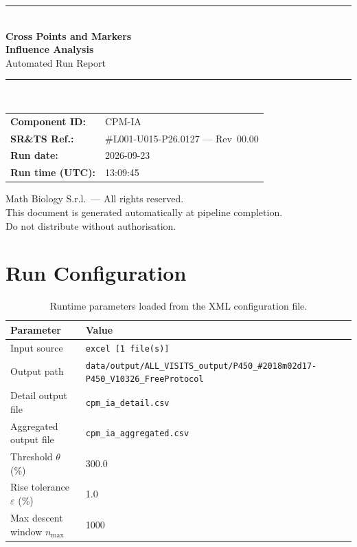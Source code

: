 \documentclass[a4paper,11pt]{article}
\begin{document}
\begin{titlepage}
\begin{center}
  \vspace*{1.8cm}
  {\color{dmaaccent}\rule{\linewidth}{1.5pt}}\\[0.6cm]
  {\LARGE\bfseries\color{dmaaccent}
    Cross Points and Markers\\[0.25cm]
    Influence Analysis}\\[0.4cm]
  {\Large Automated Run Report}\\[0.3cm]
  {\color{dmaaccent}\rule{\linewidth}{1.5pt}}\\[2cm]

  \begin{tabular}{ll}
    \textbf{Component ID:}   & CPM-IA \\[0.3cm]
    \textbf{SR\&TS Ref.:}    & \#L001-U015-P26.0127 --- Rev~00.00 \\[0.3cm]
    \textbf{Run date:}       & 2026-09-23 \\[0.3cm]
    \textbf{Run time (UTC):} & 13:09:45 \\
  \end{tabular}

  \vfill
  {\color{dmagray}\small
    Math Biology S.r.l.\ --- All rights reserved.\\
    This document is generated automatically at pipeline completion.\\
    Do not distribute without authorisation.}
\end{center}
\end{titlepage}

\tableofcontents
\clearpage

\section{Run Configuration}

\begin{table}[h!]
\centering
\small
\caption{Runtime parameters loaded from the XML configuration file.}
\begin{tabular}{ll}
\toprule
\textbf{Parameter} & \textbf{Value} \\
\midrule
Input source                      & \texttt{excel [1 file(s)]} \\
Output path                       & \texttt{data/output/ALL\_VISITS\_output/P450\_\#2018m02d17-P450\_V10326\_FreeProtocol} \\
Detail output file                & \texttt{cpm\_ia\_detail.csv} \\
Aggregated output file            & \texttt{cpm\_ia\_aggregated.csv} \\
Threshold $\theta$ (\%)           & 300.0 \\
Rise tolerance $\varepsilon$ (\%) & 1.0 \\
Max descent window $n_{\max}$     & 1000 \\
\bottomrule
\end{tabular}
\end{table}
\end{document}
